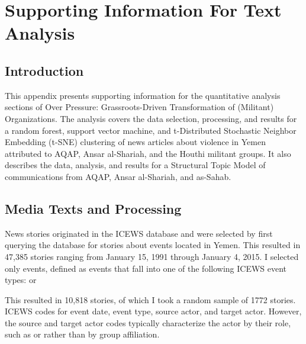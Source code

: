 \chapter{Supporting Information For Text Analysis}
\label{textappendix}


\section{Introduction}

This appendix presents supporting information for the quantitative analysis sections of Over Pressure: Grassroots-Driven Transformation of (Militant) Organizations. The analysis covers the data selection, processing, and results for a random forest, support vector machine, and t-Distributed Stochastic Neighbor Embedding (t-SNE) clustering of news articles about violence in Yemen attributed to AQAP, Ansar al-Shariah, and the Houthi militant groups. It also describes the data, analysis, and results for a Structural Topic Model of communications from AQAP, Ansar al-Shariah, and as-Sahab.

\section{Media Texts and Processing}

News stories originated in the ICEWS database and were selected by
first querying the database for stories about events located in Yemen. This
resulted in 47,385 stories ranging from January 15, 1991 through January 4,
2015. I selected only  events, defined as events that
fall into one of the following ICEWS event types:   
          or 

This resulted in 10,818 stories, of which I took a random sample of
1772 stories. ICEWS codes for event date, event type, source actor,
and target actor. However, the source and target actor codes typically
characterize the actor by their role, such as  or
 rather than by group affiliation.

